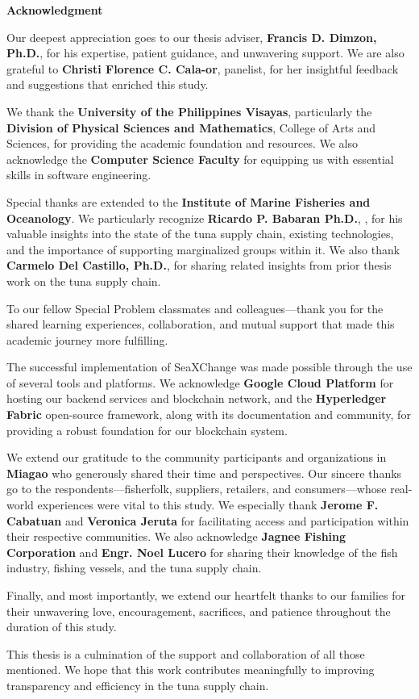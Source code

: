 \begin{center}
	\textbf{Acknowledgment}
\end{center}

Our deepest appreciation goes to our thesis adviser, \textbf{Francis D. Dimzon, Ph.D.}, for his expertise, patient guidance, and unwavering support. We are also grateful to \textbf{Christi Florence C. Cala-or}, panelist, for her insightful feedback and suggestions that enriched this study.

We thank the \textbf{University of the Philippines Visayas}, particularly the \textbf{Division of Physical Sciences and Mathematics}, College of Arts and Sciences, for providing the academic foundation and resources. We also acknowledge the \textbf{Computer Science Faculty} for equipping us with essential skills in software engineering.

Special thanks are extended to the \textbf{Institute of Marine Fisheries and Oceanology}. We particularly recognize \textbf{Ricardo P. Babaran Ph.D.}, , for his valuable insights into the state of the tuna supply chain, existing technologies, and the importance of supporting marginalized groups within it. We also thank \textbf{Carmelo Del Castillo, Ph.D.}, for sharing related insights from prior thesis work on the tuna supply chain. 

To our fellow Special Problem classmates and colleagues—thank you for the shared learning experiences, collaboration, and mutual support that made this academic journey more fulfilling.

The successful implementation of SeaXChange was made possible through the use of several tools and platforms. We acknowledge \textbf{Google Cloud Platform} for hosting our backend services and blockchain network, and the \textbf{Hyperledger Fabric} open-source framework, along with its documentation and community, for providing a robust foundation for our blockchain system.

We extend our gratitude to the community participants and organizations in \textbf{Miagao} who generously shared their time and perspectives. Our sincere thanks go to the respondents—fisherfolk, suppliers, retailers, and consumers—whose real-world experiences were vital to this study. We especially thank \textbf{Jerome F. Cabatuan} and \textbf{Veronica Jeruta} for facilitating access and participation within their respective communities. We also acknowledge \textbf{Jagnee Fishing Corporation} and \textbf{Engr. Noel Lucero} for sharing their knowledge of the fish industry, fishing vessels, and the tuna supply chain.

Finally, and most importantly, we extend our heartfelt thanks to our families for their unwavering love, encouragement, sacrifices, and patience throughout the duration of this study.

This thesis is a culmination of the support and collaboration of all those mentioned. We hope that this work contributes meaningfully to improving transparency and efficiency in the tuna supply chain.

